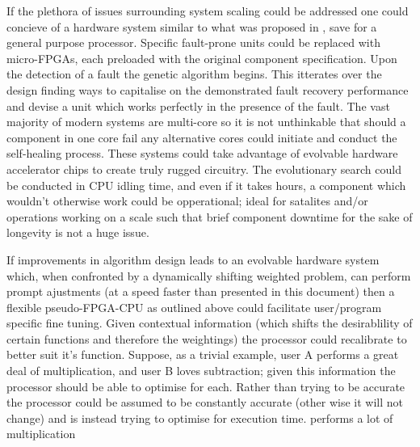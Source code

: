 If the plethora of issues surrounding system scaling could be addressed
one could concieve of a hardware system similar to what was proposed in
\cite{10.1007/3-540-61093-6_6}, save for a general purpose processor.
Specific fault-prone units could be replaced with micro-FPGAs, each preloaded
with the original component specification. Upon the detection of a fault
the genetic algorithm begins. This itterates over the design finding ways to
capitalise on the demonstrated fault recovery performance and devise a unit
which works perfectly in the presence of the fault. The vast majority of modern systems are multi-core
so it is not unthinkable that should a component in one core fail any alternative
cores could initiate and conduct the self-healing process. These systems
could take advantage of evolvable hardware accelerator chips to create
truly rugged circuitry. The evolutionary search could be conducted in
CPU idling time, and even if it takes hours, a component which wouldn't
otherwise work could be opperational; ideal for satalites and/or operations
working on a scale such that brief component downtime for the sake of
longevity is not a huge issue.

If improvements in algorithm design leads to an evolvable hardware system
which, when confronted by a dynamically shifting weighted problem, can
perform prompt ajustments (at a speed faster than presented in this document)
then a flexible pseudo-FPGA-CPU as outlined above could facilitate
user/program specific fine tuning. Given contextual information (which shifts
the desirablility of certain functions and therefore the weightings) the
processor could recalibrate to better suit it's function. Suppose,
as a trivial example, user A performs a great deal of multiplication,
and user B loves subtraction; given this information the processor should
be able to optimise for each. Rather than trying to be accurate the processor
could be assumed to be constantly accurate (other wise it will not change)
and is instead trying to optimise for execution time.
performs a lot of multiplication
